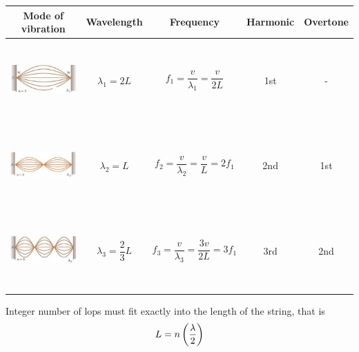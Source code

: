 \begin{table}[H]
  \centering
  \begin{tabular}{|c|c|c|c|c|}
    \hline
    \textbf{Mode of vibration} & \textbf{Wavelength} & \textbf{Frequency} & \textbf{Harmonic} & \textbf{Overtone}\\
    \hline
    \begin{minipage}{.3\textwidth}
      \includegraphics[width=\linewidth, height=30mm]{images/stretched_string_1.jpg}
    \end{minipage}
    & $\lambda_1=2L$ & $f_1=\dfrac{v}{\lambda_1}=\dfrac{v}{2L}$ & 1st & - \\
    \hline
    \begin{minipage}{.3\textwidth}
      \includegraphics[width=\linewidth, height=30mm]{images/stretched_string_2.jpg}
    \end{minipage}
    & $\lambda_2=L$ & $f_2=\dfrac{v}{\lambda_2}=\dfrac{v}{L}=2f_1$ & 2nd & 1st \\
    \hline
    \begin{minipage}{.3\textwidth}
      \includegraphics[width=\linewidth, height=30mm]{images/stretched_string_3.jpg}
    \end{minipage}
    & $\lambda_3=\dfrac{2}{3}L$ & $f_3=\dfrac{v}{\lambda_3}=\dfrac{3v}{2L}=3f_1$ & 3rd & 2nd \\
    \hline
  \end{tabular}
\end{table}

Integer number of lops must fit exactly into the length of the string, that is
\[ L=n\left(\frac{\lambda}{2}\right) \]

